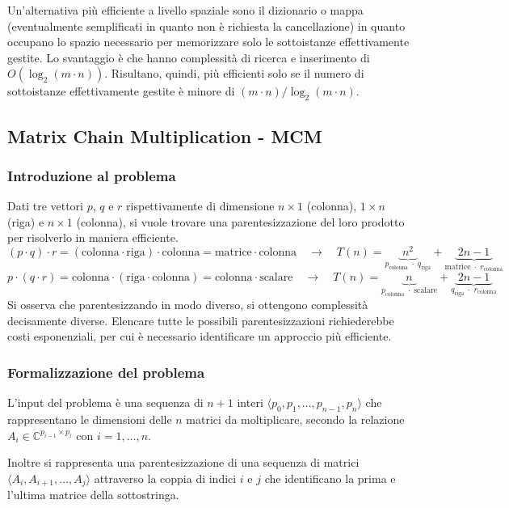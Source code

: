 Un'alternativa più efficiente a livello spaziale sono il dizionario o mappa (eventualmente semplificati in quanto non è
richiesta la cancellazione) in quanto occupano lo spazio necessario per memorizzare solo le sottoistanze effettivamente
gestite. Lo svantaggio è che hanno complessità di ricerca e inserimento di \(O(\log_2 (m \cdot n))\). Risultano, quindi,
più efficienti solo se il numero di sottoistanze effettivamente gestite è minore di \((m \cdot n)/\log_2 (m \cdot n)\).

\newpage

\subsection{Matrix Chain Multiplication - MCM}
\subsubsection*{Introduzione al problema}
Dati tre vettori \(p\), \(q\) e \(r\) rispettivamente di dimensione \(n \times 1\) (colonna), \(1 \times n\) (riga) e
\(n \times 1\) (colonna), si vuole trovare una parentesizzazione del loro prodotto per risolverlo in maniera efficiente.
\[(p \cdot q) \cdot r = (\text{colonna} \cdot \text{riga}) \cdot \text{colonna} = \text{matrice} \cdot \text{colonna} \quad \rightarrow \quad T(n) = \underbrace{\; n^2 \;}_{p_\text{colonna} \; \cdot \; q_\text{riga}} + \underbrace{\; 2n-1 \;}_{\text{matrice} \; \cdot \; r_\text{colonna}}\]
\[p \cdot (q \cdot r) = \text{colonna} \cdot (\text{riga} \cdot \text{colonna}) = \text{colonna} \cdot \text{scalare} \quad \rightarrow \quad T(n) = \underbrace{\; n \;}_{p_\text{colonna} \; \cdot \; \text{scalare}} + \underbrace{\; 2n-1 \;}_{q_\text{riga} \; \cdot \; r_\text{colonna}}\]
Si osserva che parentesizzando in modo diverso, si ottengono complessità decisamente diverse. Elencare tutte le possibili
parentesizzazioni richiederebbe costi esponenziali, per cui è necessario identificare un approccio più efficiente.

\subsubsection*{Formalizzazione del problema}
L'input del problema è una sequenza di \(n+1\) interi \(\langle  p_0, p_1, \dots, p_{n-1}, p_n \rangle\) che rappresentano
le dimensioni delle \(n\) matrici da moltiplicare, secondo la relazione \(A_i \in \mathbb{C}^{p_{i-1} \times p_i}\)
con \(i = 1, \dots, n\).

Inoltre si rappresenta una parentesizzazione di una sequenza di matrici \(\langle  A_i, A_{i+1}, \dots, A_j \rangle\) attraverso
la coppia di indici \(i\) e \(j\) che identificano la prima e l'ultima matrice della sottostringa.

